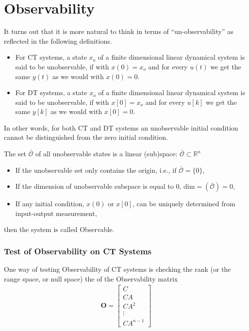 \documentclass[twoside]{article}
\begin{document}
\section{Observability}

It turns out that it is more natural to think in terms of
``un-observability'' as reflected in the following definitions.

\begin{itemize}
  \item For CT systems, a state $x_o$ of a finite dimensional linear dynamical
    system is said to be unobservable, if with $x(0) = x_o$ and
    for every $u(t)$ we get the same $y(t)$ as we would with $x(0) =
    0$. 

  \item For DT systems, a state $x_o$ of a finite dimensional linear dynamical
    system is said to be unobservable, if with $x[0] = x_o$ and
    for every $u[k]$ we get the same $y[k]$ as we would with $x[0] =
    0$. 
\end{itemize}

    In other words, for both CT and DT systems an unobservable initial condition cannot be
    distinguished from the zero initial condition.

  The set $\bar{\mathcal{O}}$ of all unobservable states is a linear
  (sub)space: $\bar{\mathcal{O}} \subset \mathbb{R}^n$

\begin{itemize}
%
 \item If the unobservable set only contains the origin, 
   i.e., if $\bar{\mathcal{O}} = \lbrace 0 \rbrace$, 
%
 \item If the dimension of unobservable subspace is equal to 0,
   $\mathrm{dim} = \left( \bar{\mathcal{O}} \right) = 0$,
 \item If any initial condition, $x(0)$ or $x[0]$, can be uniquely 
 determined from input-output measurement,
%
\end{itemize} 
then the system is called Observable. 

\subsubsection*{Test of Observability on CT Systems}

One way of testing Observability of CT systems is checking the rank
(or the range space, or null space) the of the Observability matrix
%
\begin{align*}
  \mathbf{O} =
\left[ \begin{array}{c}
C 
\\
C A
\\
C A^2 
\\
  \vdots
\\
C A^{n-1}
\end{array}
\right] 
\end{align*} 
%
\end{document}

